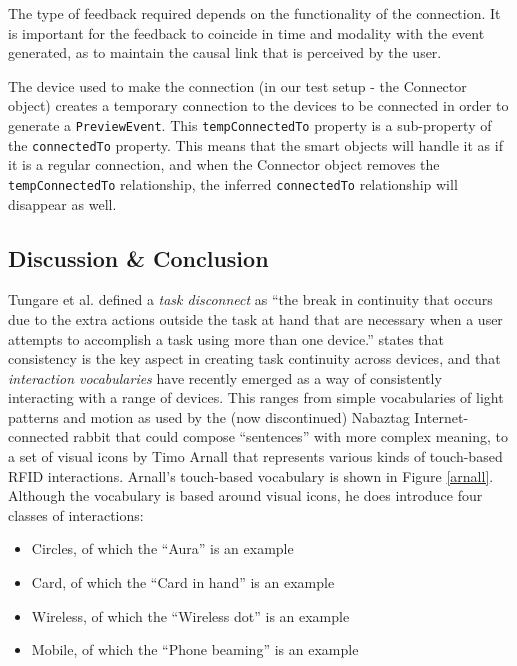 The type of feedback required depends on the functionality of the connection. It is important for the feedback to coincide in time and modality with the event generated, as to maintain the causal link that is perceived by the user.

The device used to make the connection (in our test setup - the Connector object) creates a temporary connection to the devices to be connected in order to generate a \texttt{PreviewEvent}. This \texttt{tempConnectedTo} property is a sub-property of the \texttt{connectedTo} property. This means that the smart objects will handle it as if it is a regular connection, and when the Connector object removes the \texttt{tempConnectedTo} relationship, the inferred \texttt{connectedTo} relationship will disappear as well.


\subsection{Discussion \& Conclusion}

Tungare et al. \cite{Tungare2007} defined a \emph{task disconnect} as ``the break in continuity that occurs due to the extra actions outside the task at hand that are necessary when a user attempts to accomplish a task using more than one device.'' \cite{Kuniavsky} states that consistency is the key aspect in creating task continuity across devices, and that \emph{interaction vocabularies} have recently emerged as a way of consistently interacting with a range of devices. This ranges from simple vocabularies of light patterns and motion as used by the (now discontinued) Nabaztag Internet-connected rabbit that could compose ``sentences'' with more complex meaning, to a set of visual icons by Timo Arnall \cite{Arnall2006} that represents various kinds of touch-based RFID interactions. Arnall's touch-based vocabulary is shown in Figure \ref{arnall}. Although the vocabulary is based around visual icons, he does introduce four classes of interactions: 

\begin{itemize}
	\item Circles, of which the ``Aura'' is an example
	\item Card, of which the ``Card in hand'' is an example
	\item Wireless, of which the ``Wireless dot'' is an example
	\item Mobile, of which the ``Phone beaming'' is an example
\end{itemize}

